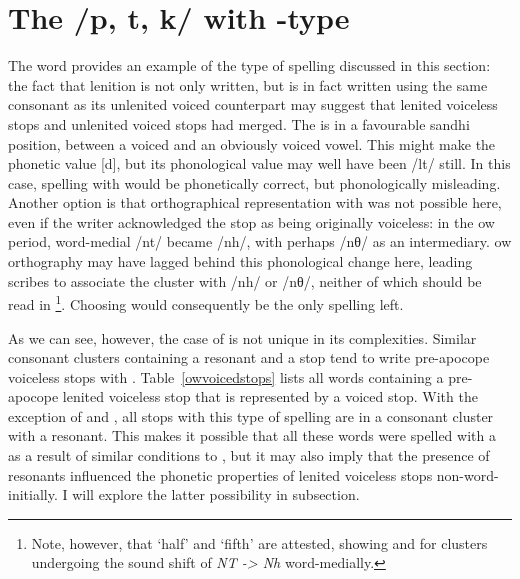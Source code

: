 \section{The /p, t, k/ with -type}
\label{ptkwithbdg}
The word  provides an example of the type of spelling discussed in this section: the fact that lenition is not only written, but is in fact written using the same consonant as its unlenited voiced counterpart  may suggest that lenited voiceless stops and unlenited voiced stops had merged.  The  is in a favourable sandhi position, between a voiced  and an obviously voiced vowel. This might make the phonetic value [d], but its phonological value may well have been /\gls{l}t/ still. In this case, spelling  with  would be phonetically correct, but phonologically misleading. Another option is that orthographical representation with  was not possible here, even if the writer acknowledged the stop as being originally voiceless: in the \gls{ow} period, word-medial /nt/ became /nh/, with perhaps /nθ/ as an intermediary. \gls{ow} orthography may have lagged behind this phonological change here, leading scribes to associate the cluster  with /nh/ or /nθ/, neither of which should be read in \footnote{Note, however, that  `half' and  `fifth' are attested, showing  and  for clusters undergoing the sound shift of \textit{NT -> Nh} word-medially.}. Choosing  would consequently be the only spelling left. 

As we can see, however, the case of  is not unique in its complexities. Similar consonant clusters containing a resonant and a stop tend to write pre-apocope voiceless stops with . Table~\ref{owvoicedstops} lists all words containing a pre-apocope lenited voiceless stop that is represented by a voiced stop. With the exception of  and , all stops with this type of spelling are in a consonant cluster with a resonant. This makes it possible that all these words were spelled with a  as a result of similar conditions to , but it may also imply that the presence of resonants influenced the phonetic properties of lenited voiceless stops non-word-initially. I will explore the latter possibility in subsection.

